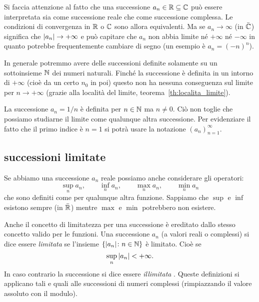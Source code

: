 Si faccia attenzione al fatto che una successione $a_n\in {\mathbb R} \subseteq {\mathbb C}$
può essere interpretata sia come successione reale che come successione complessa.
Le condizioni di convergenza in ${\mathbb R}$ o ${\mathbb C}$ sono allora equivalenti. Ma
se $a_n \to \infty$ (in $\bar {{\mathbb C}}$) significa che ${\left|a_n\right|}\to +\infty$
e può capitare che $a_n$ non abbia limite né $+\infty$
né $-\infty$ in quanto potrebbe frequentemente cambiare di segno
(un esempio è $a_n = (-n)^n$).

In generale potremmo avere delle successioni definite solamente 
su un sottoinsieme ${\mathbb N}$ dei numeri naturali. 
Finché la successione è definita in un intorno di $+\infty$ (cioè 
da un certo $n_0$ in poi) questo non ha nessuna conseguenza sul 
limite per $n\to +\infty$ (grazie alla località del limite, 
teorema~\ref{th:localita_limite}).

\begin{example}
  La successione $a_n = 1/n$ è definita per $n\in {\mathbb N}$ ma $n\neq 0$.
  Ciò non toglie che possiamo studiarne il limite come qualunque altra
  successione. Per evidenziare il fatto che il primo indice è $n=1$
  si potrà usare la notazione $(a_n)_{n=1}^\infty$.
\end{example}
 
\subsection{successioni limitate}
\label{sec:successione_limitata}%

Se abbiamo una successione $a_n$ reale possiamo anche considerare gli operatori:
\[
  \sup_n a_n, \qquad 
  \inf_n a_n, \qquad 
  \max_n a_n, \qquad 
  \min_n a_n 
\]
che sono definiti come per qualunque altra funzione. 
Sappiamo che $\sup$ e $\inf$ esistono sempre (in $\bar{{\mathbb R}}$) mentre $\max$ e $\min$
potrebbero non esistere.

Anche il concetto di limitatezza per una successione è ereditato dallo stesso 
concetto valido per le funzioni.
Una successione $a_n$ (a valori reali o complessi) si dice essere 
\emph{limitata}%
%
 se 
l'insieme $\{{\left|a_n\right|}\colon n \in {\mathbb N}\}$ è limitato. Cioè se 
\[
\sup_n {\left|a_n\right|} < +\infty.  
\]
In caso contrario la successione si dice essere \emph{illimitata}%
%
.
Queste definizioni si applicano tali e quali alle successioni di numeri 
complessi (rimpiazzando il valore assoluto con il modulo).

